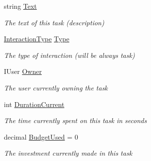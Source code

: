 \begin{DoxyCompactItemize}
\item 
string \hyperlink{class_plex_byte_1_1_mo_cap_1_1_interactions_1_1_task_ad80addfa475e483ae816bbd1bd199bf9}{Text}
\begin{DoxyCompactList}\small\item\em The text of this task (description) \end{DoxyCompactList}\item 
\hyperlink{namespace_plex_byte_1_1_mo_cap_1_1_interactions_a6e7bea333446664bbce2bb296db25e31}{Interaction\+Type} \hyperlink{class_plex_byte_1_1_mo_cap_1_1_interactions_1_1_task_a8d56efe5c3efeb4df5f291cac8a57128}{Type}
\begin{DoxyCompactList}\small\item\em The type of interaction (will be always task) \end{DoxyCompactList}\item 
I\+User \hyperlink{class_plex_byte_1_1_mo_cap_1_1_interactions_1_1_task_a3cdc15c2ceb9683e5b19d76462a5fb21}{Owner}
\begin{DoxyCompactList}\small\item\em The user currently owning the task \end{DoxyCompactList}\item 
int \hyperlink{class_plex_byte_1_1_mo_cap_1_1_interactions_1_1_task_a0f087ca6c9a9af79cddb8c409f810526}{Duration\+Current}
\begin{DoxyCompactList}\small\item\em The time currently spent on this task in seconds \end{DoxyCompactList}\item 
decimal \hyperlink{class_plex_byte_1_1_mo_cap_1_1_interactions_1_1_task_a982a30703b7b2c3258adad8e09a1ea29}{Budget\+Used} = 0
\begin{DoxyCompactList}\small\item\em The investment currently made in this task \end{DoxyCompactList}\end{DoxyCompactItemize}
